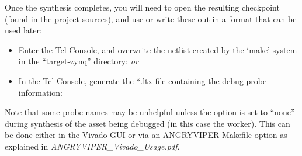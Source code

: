 \begin{flushleft}
Once the synthesis completes, you will need to open the resulting checkpoint (found in the project sources), and use  or  write these out in a format that can be used later:
\begin{itemize}
		\item Enter the Tcl Console, and overwrite the netlist created by the `make' system in the ``target-zynq'' directory:
			\subitem {}
			\subitem \textit{or}
			\subitem {}

		\item In the Tcl Console, generate the *.ltx file containing the debug probe information:
			\subitem {}
\end{itemize}
Note that some probe names may be unhelpful unless the  option is set to ``none'' during synthesis of the asset being debugged (in this case the worker). This can be done either in the Vivado GUI or via an ANGRYVIPER Makefile option as explained in \textit{ANGRYVIPER\_Vivado\_Usage.pdf}.\newline


\end{flushleft}
